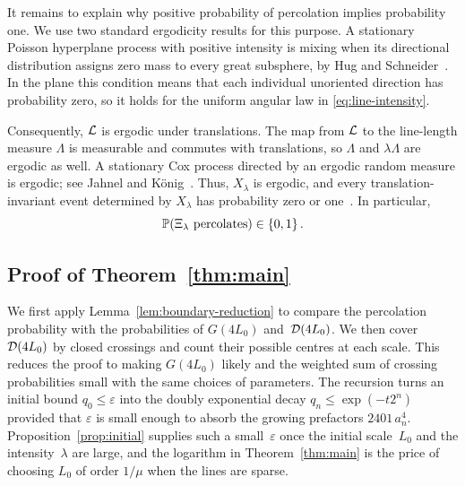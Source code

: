 \documentclass[11pt,letterpaper]{article}
\begin{document}
It remains to explain why positive probability of percolation implies probability one. We use two standard ergodicity results for this purpose. A stationary Poisson hyperplane process with positive intensity is mixing when its directional distribution assigns zero mass to every great subsphere, by Hug and Schneider~\cite[Theorem~7.1.4]{HS24}. In the plane this condition means that each individual unoriented direction has probability zero, so it holds for the uniform angular law in \eqref{eq:line-intensity}.

Consequently, $\cL$ is ergodic under translations. The map from $\cL$ to the line-length measure $\Lambda$ is measurable and commutes with translations, so $\Lambda$ and $\lambda\Lambda$ are ergodic as well. A stationary Cox process directed by an ergodic random measure is ergodic; see Jahnel and K\"onig~\cite[Exercise~6.4.14]{JK20}. Thus, $X_\lambda$ is ergodic, and every translation-invariant event determined by $X_\lambda$ has probability zero or one~\cite[Exercise~6.4.10]{JK20}. In particular,
\begin{equation}\label{eq:percolation-zero-one}
  \P(\Xi_\lambda\text{ percolates})\in\{0,1\}\,.
\end{equation}

\subsection{Proof of \texorpdfstring{Theorem~\ref{thm:main}}{the first main theorem}}
\label{sec:proof-main}

We first apply Lemma~\ref{lem:boundary-reduction} to compare the percolation probability with the probabilities of $G(4L_0)$ and~$\cD(4L_0)$. We then cover~$\cD(4L_0)$ by closed crossings and count their possible centres at each scale. This reduces the proof to making $G(4L_0)$ likely and the weighted sum of crossing probabilities small with the same choices of parameters. The recursion turns an initial bound $q_0\le\varepsilon$ into the doubly exponential decay $q_n\le\exp(-t2^n)$ provided that $\varepsilon$ is small enough to absorb the growing prefactors $2401\,a_n^4$. Proposition~\ref{prop:initial} supplies such a small~$\varepsilon$ once the initial scale~$L_0$ and the intensity~$\lambda$ are large, and the logarithm in Theorem~\ref{thm:main} is the price of choosing $L_0$ of order $1/\mu$ when the lines are sparse.
\end{document}
